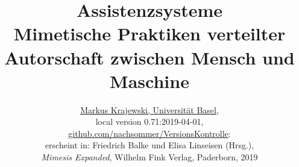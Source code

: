 \documentclass[a4paper,11pt]{article}
\date{}
\begin{document}
%
% 
\title{Assistenzsysteme\\
\normalsize Mimetische Praktiken verteilter\\ 
Autorschaft zwischen Mensch und Maschine}
\author{\href{http://gtm.mewi.unibas.ch}{Markus Krajewski, Universität Basel},\\[3mm]
local version 0.71:2019-04-01,\\
\href{https://github.com/nachsommer/VersionsKontrolle/tree/master/3.Fassung}{github.com/nachsommer/VersionsKontrolle}: \gitVer{}\\[3mm]
erscheint in: Friedrich Balke und Elisa Linseisen (Hrsg.),\\
\emph{Mimesis Expanded}, Wilhelm Fink Verlag, Paderborn, 2019}
\maketitle
\tableofcontents
\newpage
%
\end{document}
